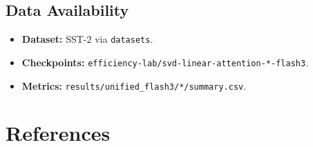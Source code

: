 \subsection{Data Availability}

\begin{itemize}
\item \textbf{Dataset:} SST-2 via \texttt{datasets}.
\item \textbf{Checkpoints:} \texttt{efficiency-lab/svd-linear-attention-*-flash3}.
\item \textbf{Metrics:} \texttt{results/unified\_flash3/*/summary.csv}.

\end{itemize}


\section{References}

